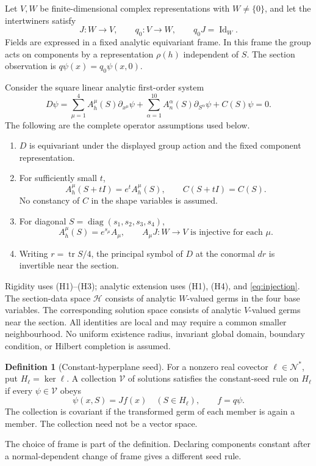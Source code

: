 \documentclass[11pt]{article}
\theoremstyle{definition}\newtheorem{definition}[theorem]{Definition}
\theoremstyle{remark}\newtheorem{remark}[theorem]{Remark}
\DeclareMathOperator{\tr}{tr}
\DeclareMathOperator{\Id}{Id}
\DeclareMathOperator{\diag}{diag}
\DeclareMathOperator{\Ker}{ker}
\newcommand{\Ncal}{\mathcal N}\newcommand{\Hobs}{\mathcal H}
\begin{document}
Let $V,W$ be finite-dimensional complex representations with $W\ne\{0\}$, and let the intertwiners satisfy
\begin{equation}\label{eq:injection}
 J:W\longrightarrow V,\qquad q_0:V\longrightarrow W,\qquad q_0J=\Id_W.
\end{equation}
Fields are expressed in a fixed analytic equivariant frame. In this frame the group acts on components by a representation $\rho(h)$ independent of $S$. The section observation is $q\psi(x)=q_0\psi(x,0)$.

Consider the square linear analytic first-order system
\begin{equation}\label{eq:D}
 D\psi=\sum_{\mu=1}^4 A_h^\mu(S)\partial_{x^\mu}\psi
       +\sum_{\alpha=1}^{10} A_n^\alpha(S)\partial_{S^\alpha}\psi
       +C(S)\psi=0.
\end{equation}
The following are the complete operator assumptions used below.
\begin{enumerate}
\item[(H1)] $D$ is equivariant under the displayed group action and the fixed component representation.
\item[(H2)] For sufficiently small $t$,
\begin{equation}\label{eq:central}
 A_h^\mu(S+tI)=e^tA_h^\mu(S),\qquad C(S+tI)=C(S).
\end{equation}
No constancy of $C$ in the shape variables is assumed.
\item[(H3)] For diagonal $S=\diag(s_1,s_2,s_3,s_4)$,
\begin{equation}\label{eq:diagonal}
 A_h^\mu(S)=e^{s_\mu}A_\mu,
 \qquad A_\mu J:W\longrightarrow V\text{ is injective for each }\mu.
\end{equation}
\item[(H4)] Writing $r=\tr S/4$, the principal symbol of $D$ at the conormal $dr$ is invertible near the section.
\end{enumerate}
Rigidity uses (H1)--(H3); analytic extension uses (H1), (H4), and \eqref{eq:injection}. The section-data space $\Hobs$ consists of analytic $W$-valued germs in the four base variables. The corresponding solution space consists of analytic $V$-valued germs near the section. All identities are local and may require a common smaller neighbourhood. No uniform existence radius, invariant global domain, boundary condition, or Hilbert completion is assumed.

\begin{definition}[Constant-hyperplane seed]
For a nonzero real covector $\ell\in\Ncal^*$, put $H_\ell=\Ker\ell$. A collection $\mathcal V$ of solutions satisfies the constant-seed rule on $H_\ell$ if every $\psi\in\mathcal V$ obeys
\begin{equation}\label{eq:seed}
 \psi(x,S)=Jf(x)\quad(S\in H_\ell),\qquad f=q\psi.
\end{equation}
The collection is covariant if the transformed germ of each member is again a member. The collection need not be a vector space.
\end{definition}
The choice of frame is part of the definition. Declaring components constant after a normal-dependent change of frame gives a different seed rule.
\end{document}
